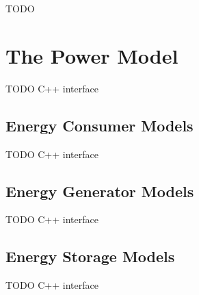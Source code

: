 \ifdraft TODO

\chapter{The Power Model}
\label{cha:power}

TODO C++ interface

\section{Energy Consumer Models}

TODO C++ interface
 
\section{Energy Generator Models}

TODO C++ interface

\section{Energy Storage Models}

TODO C++ interface

\fi



